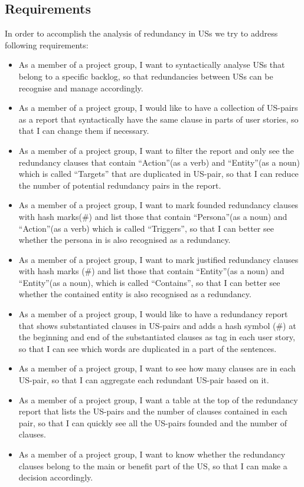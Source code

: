 \subsection{Requirements}\label{redundancy_requirement}
In order to accomplish the analysis of redundancy in USs we try to address following requirements:
\begin{itemize}
\item As a member of a project group, I want to syntactically analyse USs that belong to a specific backlog, so that redundancies between USs can be recognise and manage accordingly.
\item As a member of a project group, I would like to have a collection of US-pairs as a report that syntactically have the same clause in parts of user stories, so that I can change them if necessary.
\item As a member of a project group, I want to filter the report and only see the redundancy clauses that contain \enquote{Action}(as a verb) and \enquote{Entity}(as a noun) which is called \enquote{Targets} that are duplicated in US-pair, so that I can reduce the number of potential redundancy pairs in the report.
\item As a member of a project group, I want to mark founded redundancy clauses with hash marks(\#) and list those that contain \enquote{Persona}(as a noun) and \enquote{Action}(as a verb) which is called \enquote{Triggers}, so that I can better see whether the persona in is also recognised as a redundancy.
\item As a member of a project group, I want to mark justified redundancy clauses with hash marks (\#) and list those that contain \enquote{Entity}(as a noun) and \enquote{Entity}(as a noun), which is called \enquote{Contains}, so that I can better see whether the contained entity is also recognised as a redundancy.
\item As a member of a project group, I would like to have a redundancy report that shows substantiated clauses in US-pairs and adds a hash symbol (\#) at the beginning and end of the substantiated clauses as tag in each user story, so that I can see which words are duplicated in a part of the sentences.
\item As a member of a project group, I want to see how many clauses are in each US-pair, so that I can aggregate each redundant US-pair based on it.
\item As a member of a project group, I want a table at the top of the redundancy report that lists the US-pairs and the number of clauses contained in each pair, so that I can quickly see all the US-pairs founded and the number of clauses. 
\item As a member of a project group, I want to know whether the redundancy clauses belong to the main or benefit part of the US, so that I can make a decision accordingly.

\end{itemize}

